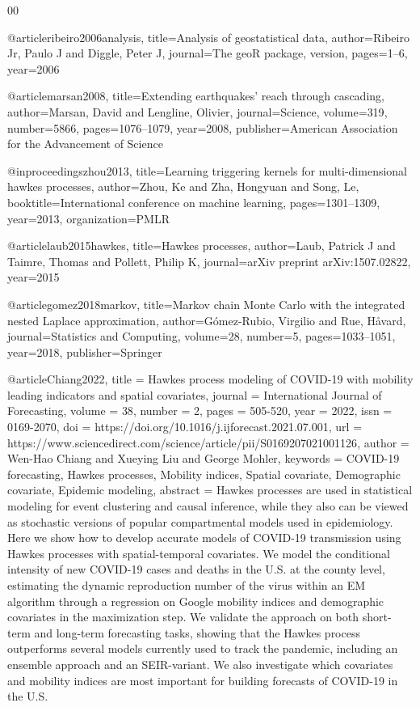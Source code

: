 \documentclass[preprint,12pt]{elsarticle}
\begin{document}
\begin{thebibliography}{00}
{@article{ribeiro2006analysis,
  title={Analysis of geostatistical data},
  author={Ribeiro Jr, Paulo J and Diggle, Peter J},
  journal={The geoR package, version},
  pages={1--6},
  year={2006}
}

@article{marsan2008,
  title={Extending earthquakes' reach through cascading},
  author={Marsan, David and Lengline, Olivier},
  journal={Science},
  volume={319},
  number={5866},
  pages={1076--1079},
  year={2008},
  publisher={American Association for the Advancement of Science}
}

@inproceedings{zhou2013,
  title={Learning triggering kernels for multi-dimensional hawkes processes},
  author={Zhou, Ke and Zha, Hongyuan and Song, Le},
  booktitle={International conference on machine learning},
  pages={1301--1309},
  year={2013},
  organization={PMLR}
}



@article{laub2015hawkes,
  title={Hawkes processes},
  author={Laub, Patrick J and Taimre, Thomas and Pollett, Philip K},
  journal={arXiv preprint arXiv:1507.02822},
  year={2015}
}

@article{gomez2018markov,
  title={Markov chain {M}onte {C}arlo with the integrated nested {L}aplace approximation},
  author={G{\'o}mez-Rubio, Virgilio and Rue, H{\aa}vard},
  journal={Statistics and Computing},
  volume={28},
  number={5},
  pages={1033--1051},
  year={2018},
  publisher={Springer}
}


@article{Chiang2022,
title = {Hawkes process modeling of COVID-19 with mobility leading indicators and spatial covariates},
journal = {International Journal of Forecasting},
volume = {38},
number = {2},
pages = {505-520},
year = {2022},
issn = {0169-2070},
doi = {https://doi.org/10.1016/j.ijforecast.2021.07.001},
url = {https://www.sciencedirect.com/science/article/pii/S0169207021001126},
author = {Wen-Hao Chiang and Xueying Liu and George Mohler},
keywords = {COVID-19 forecasting, Hawkes processes, Mobility indices, Spatial covariate, Demographic covariate, Epidemic modeling},
abstract = {Hawkes processes are used in statistical modeling for event clustering and causal inference, while they also can be viewed as stochastic versions of popular compartmental models used in epidemiology. Here we show how to develop accurate models of COVID-19 transmission using Hawkes processes with spatial-temporal covariates. We model the conditional intensity of new COVID-19 cases and deaths in the U.S. at the county level, estimating the dynamic reproduction number of the virus within an EM algorithm through a regression on Google mobility indices and demographic covariates in the maximization step. We validate the approach on both short-term and long-term forecasting tasks, showing that the Hawkes process outperforms several models currently used to track the pandemic, including an ensemble approach and an SEIR-variant. We also investigate which covariates and mobility indices are most important for building forecasts of COVID-19 in the U.S.}
}

}
\end{thebibliography}
\end{document}
